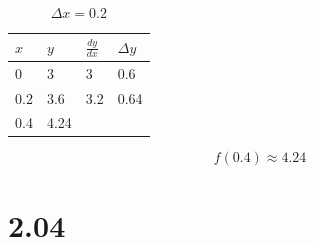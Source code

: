 \documentclass[12pt]{article}
\begin{document}
\begin{enumerate}
\begin{table}[H]
\caption{$\Delta x = 0.2$}
\centering \label{table_example}
\begin{tabular}{l|lll}
$x$ & \multicolumn{1}{l|}{$y$} & \multicolumn{1}{l|}{$\frac{dy}{dx}$} & $\Delta y$ \\ \hline
0 & 3 & 3 & 0.6 \\
0.2 & 3.6 & 3.2 & 0.64 \\
0.4 & 4.24 &  & 
\end{tabular}
\end{table}
$$\boxed{f(0.4) \approx 4.24}$$

\end{enumerate}

\section*{2.04}
\end{document}
